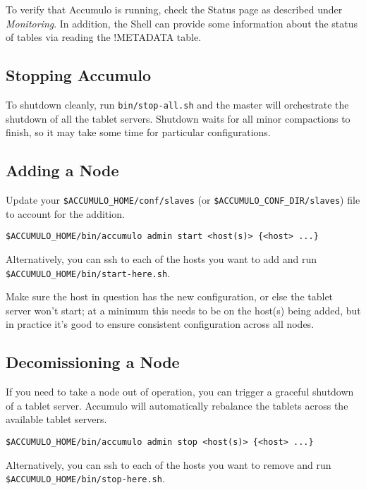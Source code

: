 To verify that Accumulo is running, check the Status page as described under
\emph{Monitoring}. In addition, the Shell can provide some information about the status of
tables via reading the !METADATA table.

\subsection{Stopping Accumulo}

To shutdown cleanly, run \texttt{bin/stop-all.sh} and the master will orchestrate the
shutdown of all the tablet servers. Shutdown waits for all minor compactions to finish, so it may
take some time for particular configurations.

\subsection{Adding a Node}

Update your \texttt{\$ACCUMULO\_HOME/conf/slaves} (or \texttt{\$ACCUMULO\_CONF\_DIR/slaves}) file to account for the addition.

\begin{verbatim}
$ACCUMULO_HOME/bin/accumulo admin start <host(s)> {<host> ...}
\end{verbatim}

Alternatively, you can ssh to each of the hosts you want to add and run 
\texttt{\$ACCUMULO\_HOME/bin/start-here.sh}.

Make sure the host in question has the new configuration, or else the tablet 
server won't start; at a minimum this needs to be on the host(s) being added, 
but in practice it's good to ensure consistent configuration across all nodes.

\subsection{Decomissioning a Node}

If you need to take a node out of operation, you can trigger a graceful shutdown of a tablet 
server. Accumulo will automatically rebalance the tablets across the available tablet servers.

\begin{verbatim}
$ACCUMULO_HOME/bin/accumulo admin stop <host(s)> {<host> ...}
\end{verbatim}

Alternatively, you can ssh to each of the hosts you want to remove and run 
\texttt{\$ACCUMULO\_HOME/bin/stop-here.sh}.

